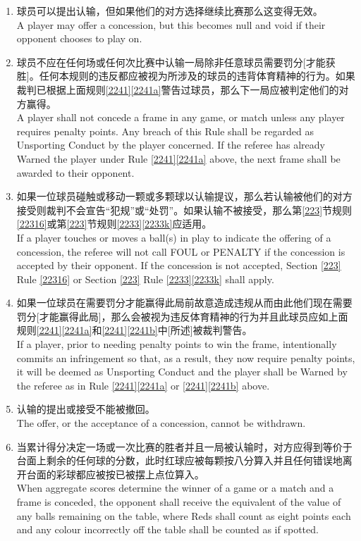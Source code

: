 \begin{enumerate}[label=(\alph*)]
    \item 球员可以提出认输，但如果他们的对方选择继续比赛那么这变得无效。\\
    A player may offer a concession, but this becomes null and void if their opponent chooses to play on.
    \item 球员不应在任何场或任何次比赛中认输一局除非任意球员需要罚分[才能获胜]。任何本规则的违反都应被视为所涉及的球员的违背体育精神的行为。如果裁判已根据上面规则\ref{2241}\ref{2241a}警告过球员，那么下一局应被判定他们的对方赢得。\\
    A player shall not concede a frame in any game, or match unless any player requires penalty points. Any breach of this Rule shall be regarded as Unsporting Conduct by the player concerned. If the referee has already Warned the player under Rule \ref{2241}\ref{2241a} above, the next frame shall be awarded to their opponent.
    \item \label{2242c}如果一位球员碰触或移动一颗或多颗球以\indicate{}认输提议，那么若认输被他们的对方接受则裁判不会宣告``犯规''或``处罚''。如果认输不被接受，那么第\ref{223}节规则\ref{22316}或第\ref{223}节规则\ref{2233}\ref{2233k}应适用。\\
    If a player touches or moves a ball(s) in play to indicate the offering of a concession, the referee will not call FOUL or PENALTY if the concession is accepted by their opponent. If the concession is not accepted, Section \ref{223} Rule \ref{22316} or Section \ref{223} Rule \ref{2233}\ref{2233k} shall apply.
    \item 如果一位球员在需要罚分才能赢得此局前故意造成违规从而由此他们现在需要罚分[才能赢得此局]，那么会被视为违反体育精神的行为并且此球员应如上面规则\ref{2241}\ref{2241a}和\ref{2241}\ref{2241b}中[所述]被裁判警告。\\
    If a player, prior to needing penalty points to win the frame, intentionally commits an infringement so that, as a result, they now require penalty points, it will be deemed as Unsporting Conduct and the player shall be Warned by the referee as in Rule \ref{2241}\ref{2241a} or \ref{2241}\ref{2241b} above.
    \item 认输的提出或接受不能被撤回。\\
    The offer, or the acceptance of a concession, cannot be withdrawn.
    \item 当累计得分决定一场或一次比赛的胜者并且一局被认输时，对方应得到等价于台面上剩余的任何球的分数，此时红球应被每颗按八分算入并且任何错误地离开台面的彩球都应被按已被摆上点位算入。\\
    When aggregate scores determine the winner of a game or a match and a frame is conceded, the opponent shall receive the equivalent of the value of any balls remaining on the table, where Reds shall count as eight points each and any colour incorrectly off the table shall be counted as if spotted.
\end{enumerate}

